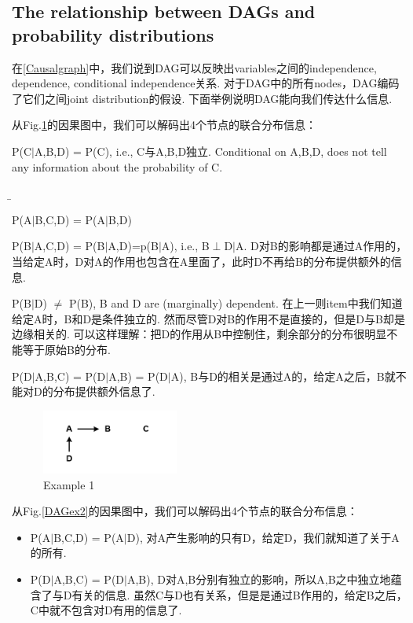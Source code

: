 \subsection{The relationship between DAGs and probability distributions} 
在\ref{Causalgraph}中，我们说到DAG可以反映出variables之间的independence, dependence, conditional independence关系. 对于DAG中的所有nodes，DAG编码了它们之间joint distribution的假设. 下面举例说明DAG能向我们传达什么信息.
\begin{ex}
	从Fig.\ref{DAGex1}的因果图中，我们可以解码出4个节点的联合分布信息：
    \begin{itemize}
    	\item P(C$|$A,B,D) = P(C), i.e., C与A,B,D独立. Conditional on A,B,D, does not tell any information about the probability of C.
        {\b \item P(A$|$B,C,D) = P(A$|$B,D) }
    	\item P(B$|$A,C,D) = P(B$|$A,D)=p(B$|$A), i.e., B$\perp$D$|$A. D对B的影响都是通过A作用的，当给定A时，D对A的作用也包含在A里面了，此时D不再给B的分布提供额外的信息.
    	\item P(B$|$D) $\neq$ P(B), B and D are (marginally) dependent. 在上一则item中我们知道给定A时，B和D是条件独立的. 然而尽管D对B的作用不是直接的，但是D与B却是边缘相关的. {\color{orange} 可以这样理解：把D的作用从B中控制住，剩余部分的分布很明显不能等于原始B的分布.}	
    	\item P(D$|$A,B,C) = P(D$|$A,B) = P(D$|$A), B与D的相关是通过A的，给定A之后，B就不能对D的分布提供额外信息了.
    \end{itemize}
\end{ex}
	\begin{figure}[htbp]
	\setlength{\abovecaptionskip}{0pt}     %
	\setlength{\belowcaptionskip}{10pt}
	\vspace{-0cm}  %
	\setlength{\abovecaptionskip}{-0cm}   %
	\setlength{\belowcaptionskip}{-0cm}   %
	\centering
	\includegraphics[width=0.4\textwidth]{figure/DAGex1.png}
	\caption{Example 1}
	\label{DAGex1}
    \end{figure}

\begin{ex}
	从Fig.\ref{DAGex2}的因果图中，我们可以解码出4个节点的联合分布信息：
	\begin{itemize}
		\item P(A$|$B,C,D) = P(A$|$D), 对A产生影响的只有D，给定D，我们就知道了关于A的所有.
		\item P(D$|$A,B,C) = P(D$|$A,B), {\color{red} D对A,B分别有独立的影响，所以A,B之中独立地蕴含了与D有关的信息.} {\color{orange} 虽然C与D也有关系，但是是通过B作用的，给定B之后，C中就不包含对D有用的信息了.}
	\end{itemize}
\end{ex}

